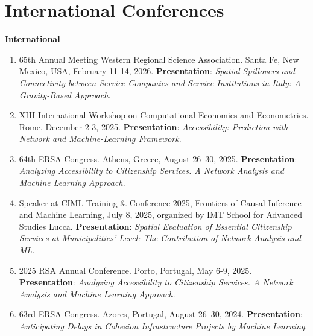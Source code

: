 \documentclass[11pt,a4paper,sans]{moderncv} %
\begin{document}

\section{\textbf{International Conferences}}

\vspace{6pt}

\textbf{International}

\begin{enumerate}[label=\arabic*.]

    \item 65th Annual Meeting Western Regional Science Association. Santa Fe, New Mexico, USA, February 11-14, 2026. \textbf{Presentation}: \textit{Spatial Spillovers and Connectivity between Service Companies and Service Institutions in Italy: A Gravity-Based Approach}.



    \item XIII International Workshop on Computational Economics and Econometrics. Rome, December 2-3, 2025. \textbf{Presentation}: \textit{Accessibility: Prediction with Network and Machine-Learning Framework}.


    
    \item 64th ERSA Congress. Athens, Greece, August 26–30, 2025. \textbf{Presentation}: \textit{Analyzing Accessibility to Citizenship Services. A Network Analysis and Machine Learning Approach}.



    \item Speaker at CIML Training \& Conference 2025, Frontiers of Causal Inference and Machine Learning, July 8, 2025, organized by IMT School for Advanced Studies Lucca. \textbf{Presentation}: \textit{Spatial Evaluation of Essential Citizenship Services at Municipalities' Level: The Contribution of Network Analysis and ML}.
    


    \item 2025 RSA Annual Conference. Porto, Portugal, May 6-9, 2025. \textbf{Presentation}: \textit{Analyzing Accessibility to Citizenship Services. A Network Analysis and Machine Learning Approach}.



    \item 63rd ERSA Congress. Azores, Portugal, August 26–30, 2024. \textbf{Presentation}: \textit{Anticipating Delays in Cohesion Infrastructure Projects by Machine Learning}.
    

\end{enumerate}
\end{document}
